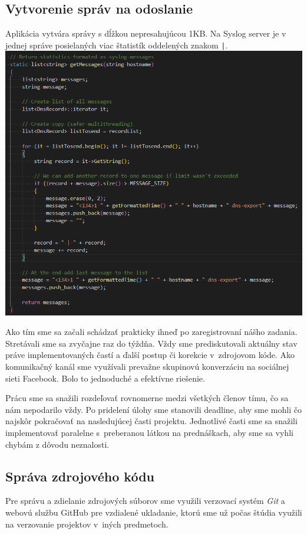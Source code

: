 \documentclass{article}
\begin{document}
        \subsection{Vytvorenie správ na odoslanie}
        Aplikácia vytvára správy s dĺžkou nepresahujúcou 1KB. Na Syslog server je v jednej správe posielaných viac štatistík oddelených znakom \texttt{|}.
        \includegraphics {messages.png}


    Ako tím sme sa začali schádzať prakticky ihneď po zaregistrovaní nášho zadania. Stretávali sme sa 
    zvyčajne raz do týždňa. Vždy sme prediskutovali aktuálny stav práve implementovaných častí 
    a ďalší postup či korekcie v~zdrojovom kóde. Ako komunikačný kanál sme využívali prevažne 
    skupinovú konverzáciu na sociálnej sieti Facebook. Bolo to jednoduché a efektívne riešenie.

    Prácu sme sa snažili rozdeľovať rovnomerne medzi všetkých členov tímu, čo sa nám nepodarilo vždy. 
    Po pridelení úlohy sme stanovili deadline, aby sme mohli čo najskôr pokračovať na nasledujúcej časti projektu. 
    Jednotlivé časti sme sa snažili implementovať paralelne s~preberanou látkou na prednáškach, aby sme sa vyhli chybám z dôvodu neznalosti.
    

        \subsection{Správa zdrojového kódu}
        Pre správu a zdielanie zdrojových súborov sme využili verzovací systém \emph{Git} a webovú službu GitHub pre vzdialené ukladanie, ktorú sme už počas štúdia využili na verzovanie projektov v~iných predmetoch.
        
\end{document}
